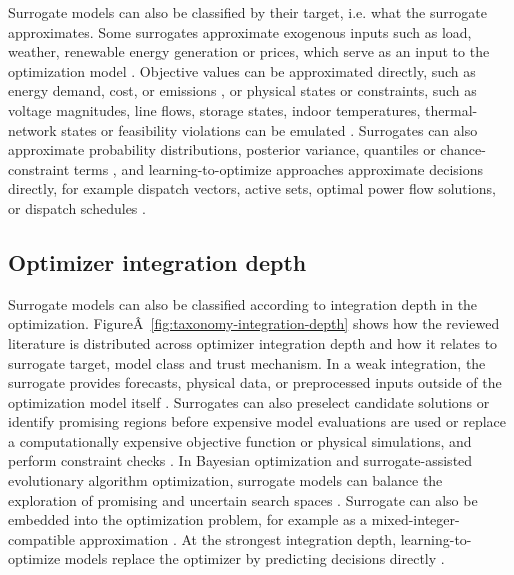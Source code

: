 \documentclass[final,5p,times,twocolumn]{elsarticle}
\begin{document}
Surrogate models can also be classified by their target, i.e. what the
surrogate approximates. Some surrogates approximate exogenous inputs
such as load, weather, renewable energy generation or prices, which
serve as an input to the optimization model
\cite{Eseye201991463,Li2020,Hanifi2024,Conti2026}. Objective values
can be approximated directly, such as energy demand, cost, or emissions
\cite{Westermann2019,Hirvonen2017323,Ahmad202451}, or
physical states or constraints, such as voltage magnitudes, line flows,
storage states, indoor temperatures, thermal-network states or
feasibility violations can be emulated
\cite{Park2019,Su2022315,Mohammadi2024,Khaloie2025}. Surrogates can
also approximate probability distributions, posterior variance,
quantiles or chance-constraint terms
\cite{Muhlpfordt20194806,Hu2020,Volodina2022,Tan2026}, and
learning-to-optimize approaches approximate decisions directly, for
example dispatch vectors, active sets, optimal power flow solutions, or
dispatch schedules
\cite{Wu2022231,Chen2022,Chen20244723,Xu20223066,Li202359995,Liang20246508}.

\subsection{Optimizer integration depth}
\label{sec:tax:integration-depth}

Surrogate models can also be classified according to integration depth
in the optimization.
FigureÂ~\ref{fig:taxonomy-integration-depth} shows how the reviewed
literature is distributed across optimizer integration depth and how it
relates to surrogate target, model class and trust mechanism. In a weak
integration, the surrogate provides forecasts, physical data, or
preprocessed inputs outside of the optimization model itself
\cite{Eseye201991463,Li2020,Hanifi2024}. Surrogates can also preselect
candidate solutions or identify promising regions before expensive model
evaluations are used \cite{Han2018622,Schulte2020,Pang2023,Xiao2018}
or replace a computationally expensive objective function or physical
simulations, and perform constraint checks
\cite{Hirvonen2017323,Deng2020831,Thrampoulidis2021}. In
Bayesian optimization and surrogate-assisted evolutionary algorithm
optimization, surrogate models can balance the exploration of promising
and uncertain search spaces
\cite{DiazManriquez2016,Hu2020,Schulte2020,Volodina2022}. Surrogate
can also be embedded into the optimization problem, for example as a
mixed-integer-compatible approximation
\cite{Wu2022231,Chen2022,Lin2023,Pang2023}. At the strongest
integration depth, learning-to-optimize models replace the optimizer by
predicting decisions directly
\cite{Wu2022231,Chen20244723,Li202359995,Liang20246508}.
\end{document}
